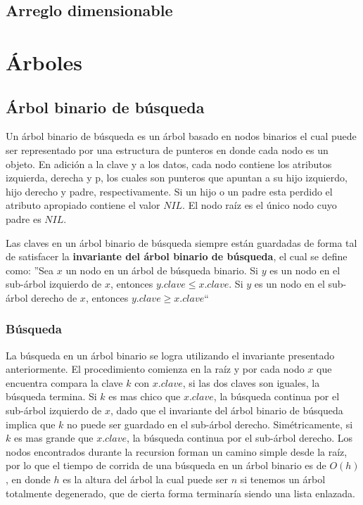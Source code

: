 \subsection{Arreglo dimensionable}

\newpage
\section{\'Arboles}
\subsection{\'Arbol binario de b\'usqueda}

Un \'arbol binario de b\'usqueda es un \'arbol basado en nodos binarios el cual puede ser representado por una estructura de punteros en donde cada nodo es un objeto. En adici\'on a la clave y a los datos, cada nodo contiene los atributos izquierda, derecha y p, los cuales son punteros que apuntan a su hijo izquierdo, hijo derecho y padre, respectivamente. Si un hijo o un padre esta perdido el atributo apropiado contiene el valor $NIL$. El nodo ra\'iz es el \'unico nodo cuyo padre es $NIL$.

Las claves en un \'arbol binario de b\'usqueda siempre est\'an guardadas de forma tal de satisfacer la \textbf{invariante del \'arbol binario de b\'usqueda}, el cual se define como: ''Sea $x$ un nodo en un \'arbol de b\'usqueda binario. Si $y$ es un nodo en el sub-\'arbol izquierdo de $x$, entonces $y.clave \leq x.clave$. Si $y$ es un nodo en el sub-\'arbol derecho de $x$, entonces $y.clave \geq x.clave$``

\subsubsection{B\'usqueda}

La b\'usqueda en un \'arbol binario se logra utilizando el invariante presentado anteriormente. El procedimiento comienza en la ra\'iz y por cada nodo $x$ que encuentra compara la clave $k$ con $x.clave$, si las dos claves son iguales, la b\'usqueda termina. Si $k$ es mas chico que $x.clave$, la b\'usqueda continua por el sub-\'arbol izquierdo de $x$, dado que el invariante del \'arbol binario de b\'usqueda implica que $k$ no puede ser guardado en el sub-\'arbol derecho. Sim\'etricamente, si $k$ es mas grande que $x.clave$, la b\'usqueda continua por el sub-\'arbol derecho. Los nodos encontrados durante la recursion forman un camino simple desde la ra\'iz, por lo que el tiempo de corrida de una b\'usqueda en un \'arbol binario es de $O(h)$, en donde $h$ es la altura del \'arbol la cual puede ser $n$ si tenemos un \'arbol totalmente degenerado, que de cierta forma terminar\'ia siendo una lista enlazada.

